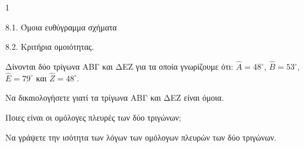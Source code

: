 \begin{ylh}{1}
    \item 8.1. Όμοια ευθύγραμμα σχήματα
    \item 8.2. Κριτήρια ομοιότητας.
\end{ylh}
Δίνονται δύο τρίγωνα ΑΒΓ και ΔΕΖ για τα οποία γνωρίζουμε ότι:
$\hat{A} = 48^\circ$, $\hat{B} = 53^\circ$, $\hat{E} = 79^\circ$ και $\hat{Z} = 48^\circ$.

\begin{alist}
    \item Να δικαιολογήσετε γιατί τα τρίγωνα ΑΒΓ και ΔΕΖ είναι όμοια. 
    \item \begin{rlist}
        \item Ποιες είναι οι ομόλογες πλευρές των δύο τριγώνων; 
        \item Να γράψετε την ισότητα των λόγων των ομόλογων πλευρών των δύο τριγώνων. 
    \end{rlist}
\end{alist}